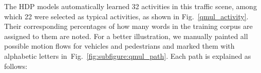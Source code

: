 The HDP models automatically learned 32 activities in this traffic scene, among which 22 were selected as typical activities, as shown in Fig.~\ref{qmul_activity}. Their corresponding percentages of how many words in the training corpus are assigned to them are noted. For a better illustration, we manually painted all possible motion flows for vehicles and pedestrians and marked them with alphabetic letters in~Fig.~\ref{fig:subfigure:qmul_path}. Each path is explained as follows:

\begin{figure}[!htbp]
	\renewcommand{\thesubfigure}{\arabic{subfigure}}
	\makeatletter
	\renewcommand{\@thesubfigure}{(\thesubfigure)\space}
	\renewcommand{\p@subfigure}{\thefigure.}
	\makeatother
	\centering
	\centering

\end{figure}
